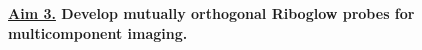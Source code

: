 \textbf{\underline{Aim 3.} Develop mutually orthogonal Riboglow probes for multicomponent imaging.}\\

